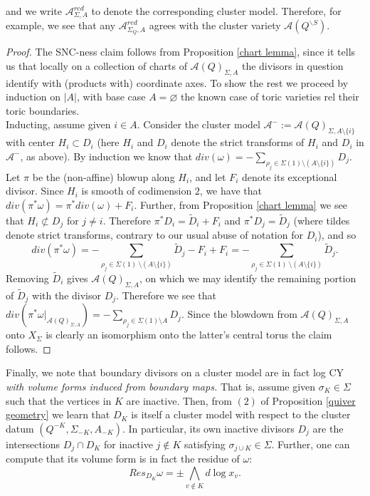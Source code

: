 \documentclass[11pt]{amsart}
\theoremstyle{definition}
\theoremstyle{remark}
\newcommand{\A}{\mathcal{A}}
\renewcommand{\emptyset}{\varnothing}
\numberwithin{equation}{section}
\begin{document}
\noindent and we write $\A^{red}_{\Sigma, A}$ to denote the corresponding cluster model. Therefore, for example, we see that any $\A^{red}_{\Sigma_Q, A}$ agrees with the cluster variety $\mathcal{A}(Q^{\backslash S})$.

\begin{proof}
The SNC-ness claim follows from Proposition \ref{chart lemma}, since it tells us that locally on a collection of charts of $\mathcal{A}(Q)_{\Sigma, A}$ the divisors in question identify with (products with) coordinate axes. To show the rest we proceed by induction on $|A|$, with base case $A = \emptyset$ the known case of toric varieties rel their toric boundaries.\\

Inducting, assume given $i\in A$. Consider the cluster model $\A^-:=\mathcal{A}(Q)_{\Sigma,A\setminus\{i\}}$ with center $H_i\subset D_i$ (here $H_i$ and $D_i$ denote the strict transforms of $H_i$ and $D_i$ in $\A^-$, as above). By induction we know that $div(\omega)=-\sum_{\rho_j \in \Sigma(1) \setminus (A \setminus\{i\})} D_j$. Let $\pi$ be the (non-affine) blowup along $H_i$, and let $F_i$ denote its exceptional divisor. Since $H_i$ is smooth of codimension $2$, we have that $div (\pi^*\omega)=\pi^*div(\omega)+F_i$. Further, from Proposition \ref{chart lemma} we see that $H_i\not\subset D_j$ for $j\neq i$. Therefore $\pi^*D_i=\tilde D_i+F_i$ and $\pi^*D_j=\tilde D_j$ (where tildes denote strict transforms, contrary to our usual abuse of notation for $D_i$), and so
$$div(\pi^*\omega)=-\sum_{\rho_j \in \Sigma(1) \
\setminus (A \setminus \{i\})} \tilde D_j-F_i+F_i=-\sum_{\rho_j \in \Sigma(1) \
\setminus (A \setminus \{i\})} \tilde D_j.$$
Removing $\tilde D_i$ gives $\mathcal{A}(Q)_{\Sigma, A}$, on which we may identify the remaining portion of $\tilde{D}_j$ with the divisor $D_j$. Therefore we see that $div(\pi^* \omega|_{\mathcal{A}(Q)_{\Sigma, A}}) = -\sum_{\rho_j \in \Sigma(1) \setminus A} D_j$. Since the blowdown from $\mathcal{A}(Q)_{\Sigma, A}$ onto $X_\Sigma$ is clearly an isomorphism onto the latter's central torus the claim follows.
\end{proof}

Finally, we note that boundary divisors on a cluster model are in fact log CY \textit{with volume forms induced from boundary maps.} That is, assume given $\sigma_K \in \Sigma$ such that the vertices in $K$ are inactive. Then, from $(2)$ of Proposition \ref{quiver geometry} we learn that $D_K$ is itself a cluster model with respect to the cluster datum $(Q^{-K},\Sigma_{-K},A_{-K})$. In particular, its own inactive divisors $D_j$ are the intersections $D_j\cap D_K$ for inactive $j \notin K$ satisfying $\sigma_{j \cup K} \in \Sigma$. Further, one can compute that its volume form is in fact the residue of $\omega$:
$$Res_{D_K}\omega=\pm\bigwedge_{v\notin K}d\log x_v.$$
\end{document}
